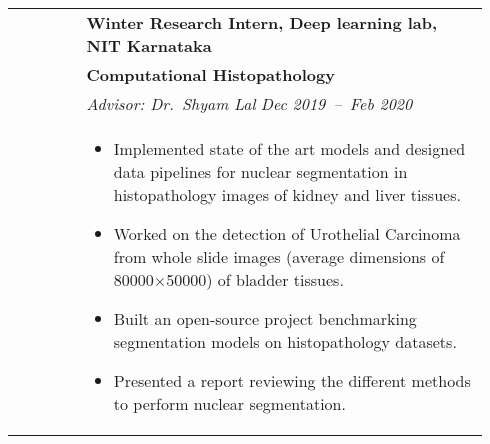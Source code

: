 \documentclass[letterpaper, 10pt, oneside]{article}
\newcommand{\bdit}[1]{{\textbf{#1}}}
\begin{document}
\begin{longtable}{@{} p{0.14\linewidth} p{0.8\linewidth}}
                         & \bdit{Winter Research Intern, Deep learning lab, NIT Karnataka}                                                                                                                                                          \\
                         & \bdit{Computational Histopathology}                                                                                                                                                                                      \\
                         & \textsl{Advisor: Dr.\ Shyam Lal} \hfill \hspace{-3em} \textsl{Dec 2019\ --\ Feb 2020}                                                                                                                                    \\
                         & \parbox{0.8\textwidth}{                                                                                                                                                                                                  %
        \begin{itemize}[leftmargin=*, itemsep=-0.88ex, topsep=-0.88ex]
            \item Implemented state of the art models and designed data pipelines for nuclear segmentation in histopathology images of kidney and liver tissues.
            \item Worked on the detection of Urothelial Carcinoma from whole slide images (average dimensions of 80000$\times$50000) of bladder tissues.
            \item Built an open-source project benchmarking segmentation models on histopathology datasets.
            \item Presented a report reviewing the different methods to perform nuclear segmentation.
        \end{itemize}
    }
    \\
    \\


\end{longtable}
\end{document}
